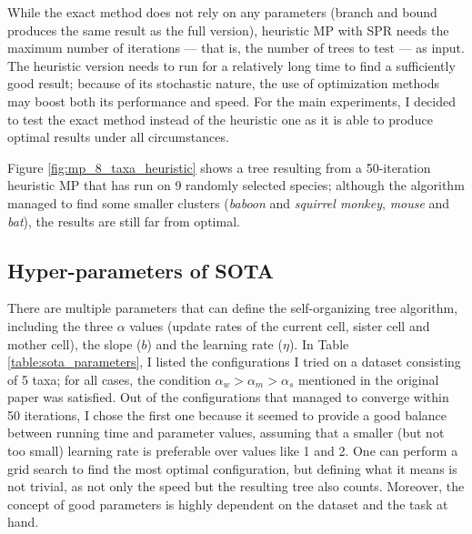 \documentclass[11pt,twocolumn]{article}
\begin{document}
While the exact method does not rely on any parameters (branch and bound produces the same result as the full version), heuristic MP with SPR needs the maximum number of iterations — that is, the number of trees to test — as input. The heuristic version needs to run for a relatively long time to find a sufficiently good result; because of its stochastic nature, the use of optimization methods may boost both its performance and speed. For the main experiments, I decided to test the exact method instead of the heuristic one as it is able to produce optimal results under all circumstances.

Figure \ref{fig:mp_8_taxa_heuristic} shows a tree resulting from a 50-iteration heuristic MP that has run on 9 randomly selected species; although the algorithm managed to find some smaller clusters (\textit{baboon} and \textit{squirrel monkey}, \textit{mouse} and \textit{bat}), the results are still far from optimal.


\subsection{Hyper-parameters of SOTA}

There are multiple parameters that can define the self-organizing tree algorithm, including the three $\alpha$ values (update rates of the current cell, sister cell and mother cell), the slope ($b$) and the learning rate ($\eta$). In Table \ref{table:sota_parameters}, I listed the configurations I tried on a dataset consisting of 5 taxa; for all cases, the condition $\alpha_w > \alpha_m > \alpha_s$ mentioned in the original paper \cite{Dopazo1997} was satisfied. Out of the configurations that managed to converge within 50 iterations, I chose the first one because it seemed to provide a good balance between running time and parameter values, assuming that a smaller (but not too small) learning rate is preferable over values like 1 and 2. One can perform a grid search to find the most optimal configuration, but defining what it means is not trivial, as not only the speed but the resulting tree also counts. Moreover, the concept of good parameters is highly dependent on the dataset and the task at hand.
\end{document}
